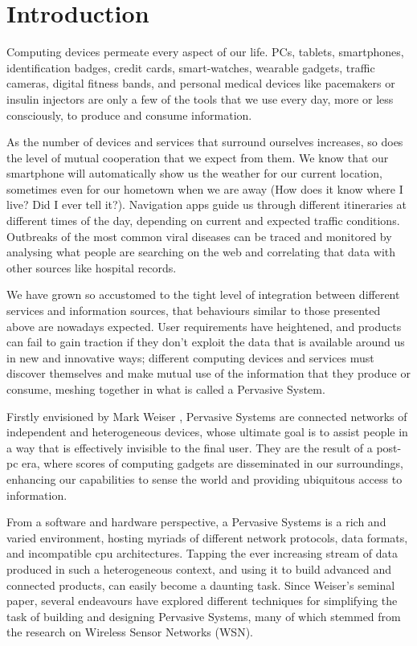 \chapter{Introduction}

Computing devices permeate every aspect of our life. PCs, tablets, smartphones,
identification badges, credit cards, smart-watches, wearable gadgets, traffic
cameras, digital fitness bands, and personal medical devices like pacemakers or
insulin injectors are only a few of the tools that we use every day, more or
less consciously, to produce and consume information.

As the number of devices and services that surround ourselves increases, so
does the level of mutual cooperation that we expect from them. We know that our
smartphone will automatically show us the weather for our current location,
sometimes even for our hometown when we are away (How does it know where I
live? Did I ever tell it?). Navigation apps guide us through different
itineraries at different times of the day, depending on current and expected
traffic conditions. Outbreaks of the most common viral diseases can be traced
and monitored by analysing what people are searching on the web and correlating
that data with other sources like hospital records.

We have grown so accustomed to the tight level of integration between different
services and information sources, that behaviours similar to those presented
above are nowadays expected. User requirements have heightened, and products
can fail to gain traction if they don’t exploit the data that is available
around us in new and innovative ways; different computing devices and services
must discover themselves and make mutual use of the information that they
produce or consume, meshing together in what is called a Pervasive System.

Firstly envisioned by Mark Weiser \cite{weiser1991computer}, Pervasive Systems
are connected networks of independent and heterogeneous devices, whose ultimate
goal is to assist people in a way that is effectively invisible to the final
user. They are the result of a post-pc era, where scores of computing gadgets
are disseminated in our surroundings, enhancing our capabilities to sense the
world and providing ubiquitous access to information.

From a software and hardware perspective, a Pervasive Systems is a rich and
varied environment, hosting myriads of different network protocols, data
formats, and incompatible cpu architectures. Tapping the ever increasing stream
of data produced in such a heterogeneous context, and using it to build
advanced and connected products, can easily become a daunting task. Since
Weiser’s seminal paper, several endeavours have explored different techniques
for simplifying the task of building and designing Pervasive Systems, many of
    which stemmed from the research on Wireless Sensor Networks (WSN).


